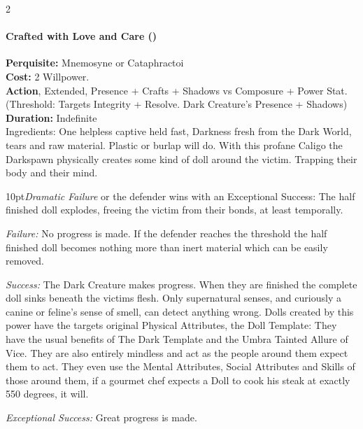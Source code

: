 \begin{multicols}{2}
\paragraph*{Crafted with Love and Care (\textbullet\textbullet\textbullet\textbullet\textbullet)} 

\noindent \textbf{Perquisite:} Mnemosyne or Cataphractoi\\

\noindent \textbf{Cost:} 2 Willpower.\\

\noindent \textbf{Action}, Extended, Presence + Crafts + Shadows vs Composure + Power Stat. (Threshold: Targets Integrity + Resolve. Dark Creature's Presence + Shadows)\\

\noindent \textbf{Duration:} Indefinite \\

\noindent Ingredients: One helpless captive held fast, Darkness fresh from the Dark World, tears and raw material. Plastic or burlap will do. With this profane Caligo the Darkspawn physically creates some kind of doll around the victim. Trapping their body and their mind.

    \begin{myindentpar}{10pt}\emph{Dramatic Failure} or the defender wins with an Exceptional Success: The half finished doll explodes, freeing the victim from their bonds, at least temporally.

    \emph{Failure:} No progress is made. If the defender reaches the threshold the half finished doll becomes nothing more than inert material which can be easily removed.

    \emph{Success:} The Dark Creature makes progress. When they are finished the complete doll sinks beneath the victims flesh. Only supernatural senses, and curiously a canine or feline's sense of smell, can detect anything wrong. Dolls created by this power have the targets original Physical Attributes, the Doll Template: They have the usual benefits of The Dark Template and the Umbra Tainted Allure of Vice. They are also entirely mindless and act as the people around them expect them to act. They even use the Mental Attributes, Social Attributes and Skills of those around them, if a gourmet chef expects a Doll to cook his steak at exactly 550 degrees, it will.

    \emph{Exceptional Success:} Great progress is made.\\ \end{myindentpar}


\end{multicols}
